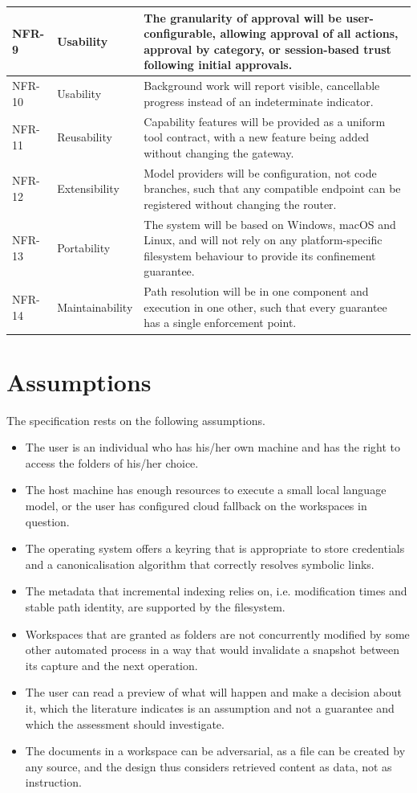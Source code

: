 \documentclass{FastFyp}
\begin{document}
{\begin{longtable}{|p{1.5cm}|p{2.5cm}|p{10.0cm}|}
\hline
NFR-9 & Usability & The granularity of approval will be user-configurable, allowing approval of all actions, approval by category, or session-based trust following initial approvals. \\
\hline
NFR-10 & Usability & Background work will report visible, cancellable progress instead of an indeterminate indicator. \\
\hline
NFR-11 & Reusability & Capability features will be provided as a uniform tool contract, with a new feature being added without changing the gateway. \\
\hline
NFR-12 & Extensibility & Model providers will be configuration, not code branches, such that any compatible endpoint can be registered without changing the router. \\
\hline
NFR-13 & Portability & The system will be based on Windows, macOS and Linux, and will not rely on any platform-specific filesystem behaviour to provide its confinement guarantee. \\
\hline
NFR-14 & Maintainability & Path resolution will be in one component and execution in one other, such that every guarantee has a single enforcement point. \\
\hline
\end{longtable}
}

\section{Assumptions}
The specification rests on the following assumptions.

\begin{itemize}
    \item The user is an individual who has his/her own machine and has the right to access the folders of his/her choice.
    \item The host machine has enough resources to execute a small local language model, or the user has configured cloud fallback on the workspaces in question.
    \item The operating system offers a keyring that is appropriate to store credentials and a canonicalisation algorithm that correctly resolves symbolic links.
    \item The metadata that incremental indexing relies on, i.e. modification times and stable path identity, are supported by the filesystem.
    \item Workspaces that are granted as folders are not concurrently modified by some other automated process in a way that would invalidate a snapshot between its capture and the next operation.
    \item The user can read a preview of what will happen and make a decision about it, which the literature indicates is an assumption and not a guarantee and which the assessment should investigate.
    \item The documents in a workspace can be adversarial, as a file can be created by any source, and the design thus considers retrieved content as data, not as instruction.
\end{itemize}
\end{document}
